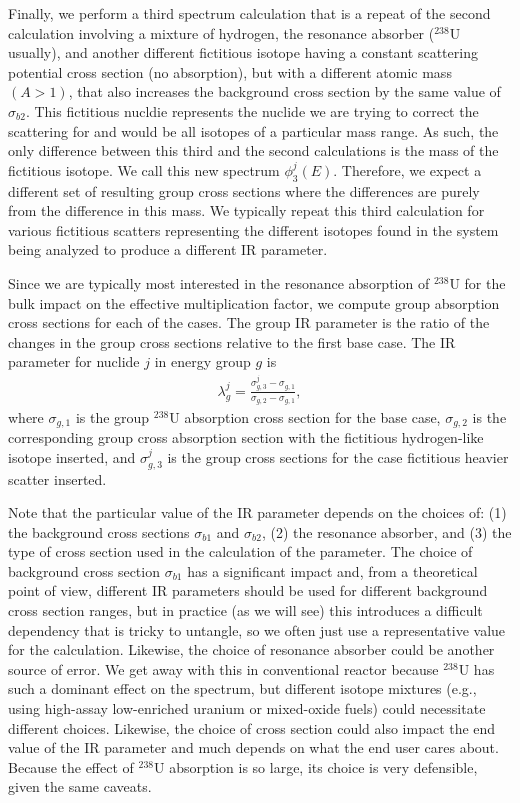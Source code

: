 Finally, we perform a third spectrum calculation that is a repeat of the second calculation involving a mixture of hydrogen, the resonance absorber ($^{238}$U usually), and another different fictitious isotope having a constant scattering potential cross section (no absorption), but with a different atomic mass $(A > 1)$, that also increases the background cross section by the same value of $\sigma_{b2}$. This fictitious nucldie represents the nuclide we are trying to correct the scattering for and would be all isotopes of a particular mass range. As such, the only difference between this third and the second calculations is the mass of the fictitious isotope. We call this new spectrum $\phi_3^j(E)$. Therefore, we expect a different set of resulting group cross sections where the differences are purely from the difference in this mass. 
We typically repeat this third calculation for various fictitious scatters representing the different isotopes found in the system being analyzed to produce a different IR parameter.

Since we are typically most interested in the resonance absorption of $^{238}$U for the bulk impact on the effective multiplication factor, we compute group absorption cross sections for each of the cases. The group IR parameter is the ratio of the changes in the group cross sections relative to the first base case. The IR parameter for nuclide $j$ in energy group $g$ is
\begin{align}
  \lambda_g^j = \frac{ \sigma_{g,3}^j -  \sigma_{g,1} }{ \sigma_{g,2} -  \sigma_{g,1} } ,
\end{align}
where $\sigma_{g,1}$ is the group $^{238}$U absorption cross section for the base case, $\sigma_{g,2}$ is the corresponding group cross absorption section with the fictitious hydrogen-like isotope inserted, and $\sigma_{g,3}^j$ is the group cross sections for the case fictitious heavier scatter inserted.

Note that the particular value of the IR parameter depends on the choices of: (1) the background cross sections $\sigma_{b1}$ and $\sigma_{b2}$, (2) the resonance absorber, and (3) the type of cross section used in the calculation of the parameter. The choice of background cross section $\sigma_{b1}$ has a significant impact and, from a theoretical point of view, different IR parameters should be used for different background cross section ranges, but in practice (as we will see) this introduces a difficult dependency that is tricky to untangle, so we often just use a representative value for the calculation. Likewise, the choice of resonance absorber could be another source of error. We get away with this in conventional reactor because $^{238}$U has such a dominant effect on the spectrum, but different isotope mixtures (e.g., using high-assay low-enriched uranium or mixed-oxide fuels) could necessitate different choices. Likewise, the choice of cross section could also impact the end value of the IR parameter and much depends on what the end user cares about. Because the effect of $^{238}$U absorption is so large, its choice is very defensible, given the same caveats.

